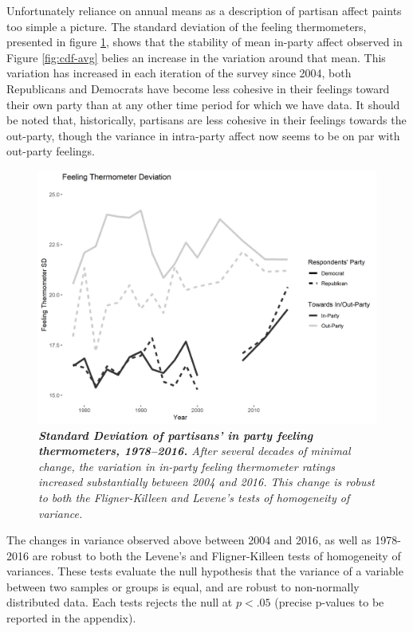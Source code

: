 \documentclass[12pt]{article}
\begin{document}
Unfortunately reliance on annual means as a description of partisan affect paints too simple a picture. The standard deviation of the feeling thermometers, presented in figure \ref{fig:cdf-sd}, shows that the stability of mean in-party affect observed in Figure \ref{fig:cdf-avg} belies an increase in the variation around that mean. This variation has increased in each iteration of the survey since 2004, both Republicans and Democrats have become less cohesive in their feelings toward their own party than at any other time period for which we have data. It should be noted that, historically, partisans are less cohesive in their feelings towards the out-party, though the variance in intra-party affect now seems to be on par with out-party feelings. %



\begin{figure}[H]
\center\includegraphics[width=5in]{cdf-sd.png}
\caption{\label{fig:cdf-sd} \textit{\textbf{Standard Deviation of partisans' in party feeling thermometers, 1978--2016.} After several decades of minimal change, the variation in in-party feeling thermometer ratings increased substantially between 2004 and 2016. This change is robust to both the Fligner-Killeen and Levene's tests of homogeneity of variance.}}
\end{figure}



The changes in variance observed above between 2004 and 2016, as well as 1978-2016 are robust to both the Levene's and Fligner-Killeen tests of homogeneity of variances. These tests evaluate the null hypothesis that the variance of a variable between two samples or groups is equal, and are robust to non-normally distributed data. Each tests rejects the null at $p<.05$ (precise p-values to be reported in the appendix).
\end{document}
